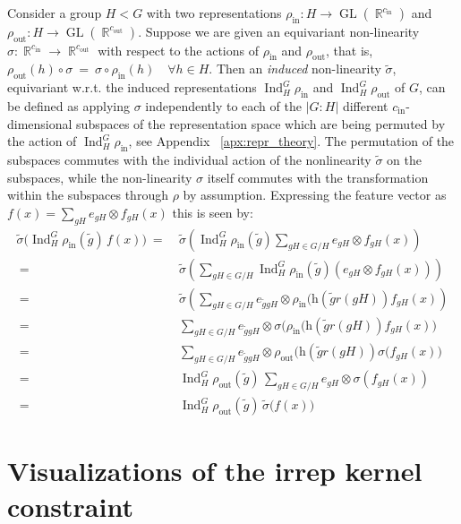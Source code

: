 \documentclass{article}
\newcommand{\apx}{Appendix\xspace
}
\newcommand{\lp}{\left(}
\newcommand{\rp}{\right)}
\DeclareMathOperator*{\R}{\mathbb{R}}
\newcommand{\GL}[1]{\ensuremath{\operatorname{GL}(#1)}}
\newcommand{\Ind}[2]{\ensuremath{\operatorname{Ind}_{#1}^{#2}}}
\begin{document}
Consider a group $H < G$ with two representations $\rho_\text{in}: H \to \GL{\R^{c_\text{in}}}$ and $\rho_\text{out}: H \to \GL{\R^{c_\text{out}}}$.
Suppose we are given an equivariant non-linearity $\sigma: \R^{c_\text{in}} \to \R^{c_\text{out}}$ with respect to the actions of $\rho_\text{in}$ and $\rho_\text{out}$, that is,
$\rho_\text{out}(h)\circ\sigma\ =\ \sigma\circ\rho_\text{in}(h) \quad\forall h\in H$.
Then an \emph{induced} non-linearity $\tilde{\sigma}$, equivariant w.r.t. the induced representations $\Ind{H}{G}\rho_\text{in}$ and $\Ind{H}{G}\rho_\text{out}$ of $G$, can be defined as applying $\sigma$ independently to each of the $|G:H|$ different $c_\text{in}$-dimensional subspaces of the representation space which are being permuted by the action of $\Ind{H}{G}\rho_\text{in}$, see \apx~\ref{apx:repr_theory}. 
The permutation of the subspaces commutes with the individual action of the nonlinearity $\tilde{\sigma}$ on the subspaces, while the non-linearity $\sigma$ itself commutes with the transformation within the subspaces through $\rho$ by assumption.
Expressing the feature vector as $f(x) = \sum_{gH} e_{gH} \otimes f_{gH}(x)$ this is seen by:
\begin{align*}
          \tilde{\sigma} \big( \Ind{H}{G}\rho_\text{in}(\tilde{g})\, f(x) \big)
    \ =&\ \tilde{\sigma}\left( \Ind{H}{G}\rho_\text{in}(\tilde{g}) \sum_{gH\in G/H} e_{gH} \otimes f_{gH}(x)\right) \\
    \ =&\ \tilde{\sigma}\left( \sum_{gH\in G/H} \Ind{H}{G}\rho_\text{in}(\tilde{g}) \lp e_{gH} \otimes f_{gH}(x) \rp \right) \\
    \ =&\ \tilde{\sigma}\left( \sum_{gH\in G/H} e_{\tilde{g}gH} \otimes \rho_\text{in}(\text{h}(\tilde{g}r(gH))f_{gH}(x)\right) \\
    \ =&\ \sum_{gH\in G/H} e_{\tilde{g}gH} \otimes \sigma\big( \rho_\text{in}(\text{h}(\tilde{g}r(gH))f_{gH}(x)\big) \\
    \ =&\ \sum_{gH\in G/H} e_{\tilde{g}gH} \otimes \rho_\text{out}(\text{h}(\tilde{g}r(gH)) \sigma\big(f_{gH}(x)\big) \\
    \ =&\ \Ind{H}{G}\rho_\text{out}(\tilde{g})\, \sum_{gH\in G/H} e_{gH} \otimes \sigma\left(f_{gH}(x)\right) \\
    \ =&\ \Ind{H}{G}\rho_\text{out}(\tilde{g})\, \tilde{\sigma} \big( f(x) \big)
\end{align*}

 	
\section{Visualizations of the irrep kernel constraint}
\label{apx:constraint_decomposition}
\end{document}
